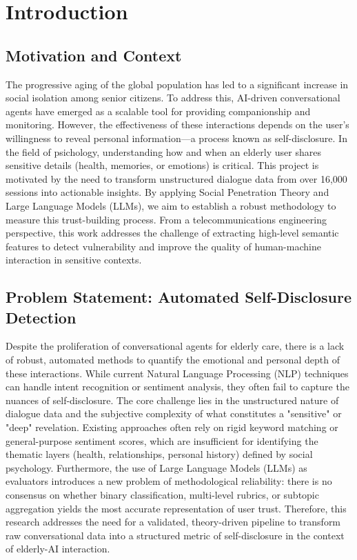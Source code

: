 \section{Introduction}
    \subsection{Motivation and Context}

The progressive aging of the global population has led to a significant increase in social isolation among senior citizens. To address this, AI-driven conversational agents have emerged as a scalable tool for providing companionship and monitoring. However, the effectiveness of these interactions depends on the user's willingness to reveal personal information—a process known as self-disclosure.
 \vspace{2mm} \newline
In the field of psichology, understanding how and when an elderly user shares sensitive details (health, memories, or emotions) is critical. This project is motivated by the need to transform unstructured dialogue data from over 16,000 sessions into actionable insights. By applying Social Penetration Theory and Large Language Models (LLMs), we aim to establish a robust methodology to measure this trust-building process. From a telecommunications engineering perspective, this work addresses the challenge of extracting high-level semantic features to detect vulnerability and improve the quality of human-machine interaction in sensitive contexts.


    \subsection{Problem Statement: Automated Self-Disclosure Detection}

Despite the proliferation of conversational agents for elderly care, there is a lack of robust, automated methods to quantify the emotional and personal depth of these interactions. While current Natural Language Processing (NLP) techniques can handle intent recognition or sentiment analysis, they often fail to capture the nuances of self-disclosure.
\vspace{2mm} \newline
The core challenge lies in the unstructured nature of dialogue data and the subjective complexity of what constitutes a "sensitive" or "deep" revelation. Existing approaches often rely on rigid keyword matching or general-purpose sentiment scores, which are insufficient for identifying the thematic layers (health, relationships, personal history) defined by social psychology. Furthermore, the use of Large Language Models (LLMs) as evaluators introduces a new problem of methodological reliability: there is no consensus on whether binary classification, multi-level rubrics, or subtopic aggregation yields the most accurate representation of user trust. Therefore, this research addresses the need for a validated, theory-driven pipeline to transform raw conversational data into a structured metric of self-disclosure in the context of elderly-AI interaction.






